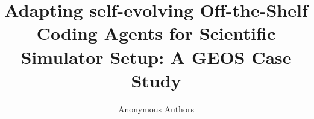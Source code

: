 \documentclass{article}
\title{Adapting self-evolving Off-the-Shelf Coding Agents for Scientific Simulator Setup: A GEOS Case Study}
\author{%
  Anonymous Authors\\
}
\begin{document}
\maketitle


\begin{abstract}


\end{abstract}
\end{document}
